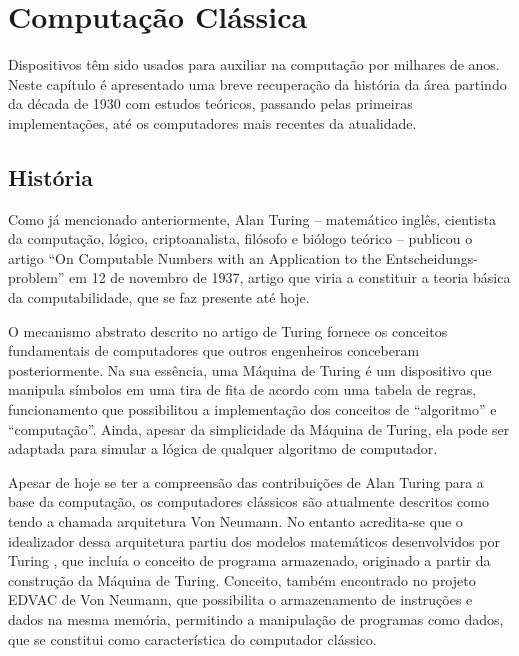 \section{Computação Clássica} 
\label{classic_comp}

Dispositivos têm sido usados para auxiliar na computação por milhares de anos. Neste capítulo é apresentado uma breve recuperação da história da área partindo da década de 1930 com estudos teóricos, passando pelas primeiras implementações, até os computadores mais recentes da atualidade.

\subsection{História}

Como já mencionado anteriormente, Alan Turing – matemático inglês, cientista da computação, lógico, criptoanalista, filósofo e biólogo teórico – publicou o artigo ``On Computable Numbers with an Application to the Entscheidungs-problem'' \cite{8} em 12 de novembro de 1937, artigo que viria a constituir a teoria básica da computabilidade, que se faz presente até hoje. 

O mecanismo abstrato descrito no artigo de Turing fornece os conceitos fundamentais de computadores que outros engenheiros conceberam posteriormente. Na sua essência, uma Máquina de Turing é um dispositivo que manipula símbolos em uma tira de fita de acordo com uma tabela de regras, funcionamento que possibilitou a implementação dos conceitos de ``algoritmo'' e ``computação''. Ainda, apesar da simplicidade da Máquina de Turing, ela pode ser adaptada para simular a lógica de qualquer algoritmo de computador.

Apesar de hoje se ter a compreensão das contribuições de Alan Turing para a base da computação, os computadores clássicos são atualmente descritos como tendo a chamada arquitetura Von Neumann. No entanto acredita-se que o idealizador dessa arquitetura partiu dos modelos matemáticos desenvolvidos por Turing \cite{10}, que incluía o conceito de programa armazenado, originado a partir da construção da Máquina de Turing. Conceito, também encontrado no projeto EDVAC \cite{9} de Von Neumann, que possibilita o armazenamento de instruções e dados na mesma memória, permitindo a manipulação de programas como dados, que se constitui como característica do computador clássico.  

